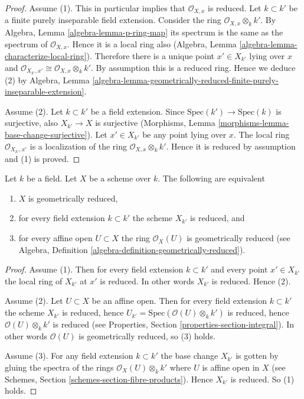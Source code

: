 \begin{proof}
Assume (1). This in particular implies that $\mathcal{O}_{X, x}$
is reduced. Let $k \subset k'$ be a finite purely inseparable field
extension. Consider the ring $\mathcal{O}_{X, x} \otimes_k k'$.
By Algebra, Lemma \ref{algebra-lemma-p-ring-map}
its spectrum is the same as the spectrum of $\mathcal{O}_{X, x}$.
Hence it is a local ring also
(Algebra, Lemma \ref{algebra-lemma-characterize-local-ring}).
Therefore there is a unique point $x' \in X_{k'}$ lying over $x$
and $\mathcal{O}_{X_{k'}, x'} \cong \mathcal{O}_{X, x} \otimes_k k'$.
By assumption this is a reduced ring. Hence we deduce (2) by
Algebra, Lemma
\ref{algebra-lemma-geometrically-reduced-finite-purely-inseparable-extension}.

\medskip\noindent
Assume (2). Let $k \subset k'$ be a field extension. Since
$\text{Spec}(k') \to \text{Spec}(k)$ is surjective, also
$X_{k'} \to X$ is surjective
(Morphisms, Lemma \ref{morphisms-lemma-base-change-surjective}).
Let $x' \in X_{k'}$ be any point lying over $x$.
The local ring $\mathcal{O}_{X_{k'}, x'}$
is a localization of the ring $\mathcal{O}_{X, x} \otimes_k k'$.
Hence it is reduced by assumption and (1) is proved.
\end{proof}

\begin{lemma}
\label{lemma-geometrically-reduced}
Let $k$ be a field.
Let $X$ be a scheme over $k$.
The following are equivalent
\begin{enumerate}
\item $X$ is geometrically reduced,
\item for every field extension $k \subset k'$ the scheme $X_{k'}$
is reduced, and
\item for every affine open $U \subset X$ the ring $\mathcal{O}_X(U)$
is geometrically reduced (see
Algebra, Definition \ref{algebra-definition-geometrically-reduced}).
\end{enumerate}
\end{lemma}

\begin{proof}
Assume (1). Then for every field extension $k \subset k'$ and
every point $x' \in X_{k'}$ the local ring of $X_{k'}$ at $x'$
is reduced. In other words $X_{k'}$ is reduced. Hence (2).

\medskip\noindent
Assume (2). Let $U \subset X$ be an affine open. Then for
every field extension $k \subset k'$ the scheme $X_{k'}$ is reduced, hence
$U_{k'} = \text{Spec}(\mathcal{O}(U)\otimes_k k')$ is reduced,
hence $\mathcal{O}(U)\otimes_k k'$ is reduced (see Properties,
Section \ref{properties-section-integral}). In other words
$\mathcal{O}(U)$ is geometrically reduced, so (3) holds.

\medskip\noindent
Assume (3). For any field extension $k \subset k'$ the base
change $X_{k'}$ is gotten by gluing the spectra of the
rings $\mathcal{O}_X(U) \otimes_k k'$ where $U$ is affine open
in $X$ (see Schemes, Section \ref{schemes-section-fibre-products}).
Hence $X_{k'}$ is reduced. So (1) holds.
\end{proof}

